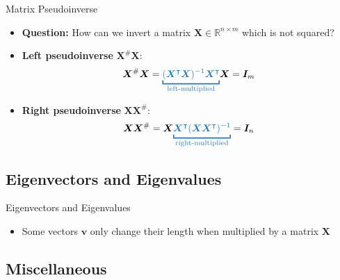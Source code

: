 \begin{frame}{Matrix Pseudoinverse}{}
	\begin{itemize}
		\item \textbf{Question:} How can we invert a matrix $\bm{X} \in \mathbb{R}^{n \times m}$ which is not squared?
		\item \textbf{Left pseudoinverse} $\bm{X}^{\#} \bm{X}$:
		\begin{equation}
			\bm{X}^{\#} \bm{X}
				= \textcolor{myblue1}{\underbracket{
					(\bm{X}^{\intercal} \bm{X})^{-1} \bm{X}^{\intercal}
				}_{\text{left-multiplied}}} \bm{X} = \bm{I}_m
		\end{equation}
		\item \textbf{Right pseudoinverse} $\bm{X} \bm{X}^{\#}$:
		\begin{equation}
			\bm{X} \bm{X}^{\#}
				= \bm{X} \textcolor{myblue1}{\underbracket{
					\bm{X}^{\intercal} (\bm{X} \bm{X}^{\intercal})^{-1}
				}_{\text{right-multiplied}}} = \bm{I}_n
		\end{equation}
	\end{itemize}
\end{frame}


\subsection{Eigenvectors and Eigenvalues}

\begin{frame}{Eigenvectors and Eigenvalues}{}
	\begin{itemize}
		\item Some vectors $\bm{v}$ only change their length when multiplied by a matrix $\bm{X}$
	\end{itemize}
\end{frame}


\subsection{Miscellaneous}

